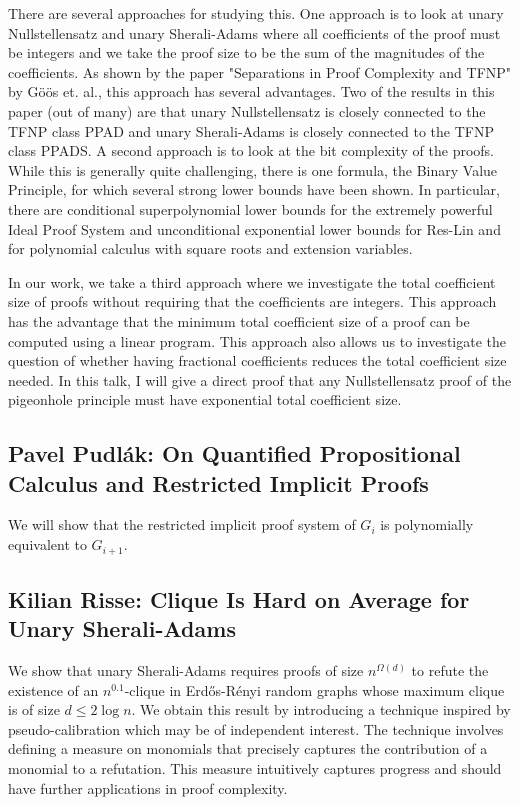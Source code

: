 \documentclass[11pt]{article}
\begin{document}
There are several approaches for studying this. One approach is to look at unary Nullstellensatz and unary Sherali-Adams where all coefficients of the proof must be integers and we take the proof size to be the sum of the magnitudes of the coefficients. As shown by the paper "Separations in Proof Complexity and TFNP" by Göös et. al., this approach has several advantages. Two of the results in this paper (out of many) are that unary Nullstellensatz is closely connected to the TFNP class PPAD and unary Sherali-Adams is closely connected to the TFNP class PPADS. A second approach is to look at the bit complexity of the proofs. While this is generally quite challenging, there is one formula, the Binary Value Principle, for which several strong lower bounds have been shown. In particular, there are conditional superpolynomial lower bounds for the extremely powerful Ideal Proof System and unconditional exponential lower bounds for Res-Lin and for polynomial calculus with square roots and extension variables.

In our work, we take a third approach where we investigate the total coefficient size of proofs without requiring that the coefficients are integers. This approach has the advantage that the minimum total coefficient size of a proof can be computed using a linear program. This approach also allows us to investigate the question of whether having fractional coefficients reduces the total coefficient size needed. In this talk, I will give a direct proof that any Nullstellensatz proof of the pigeonhole principle must have exponential total coefficient size. 



\subsection*{Pavel Pudl\'{a}k: On Quantified Propositional Calculus and Restricted Implicit Proofs}\label{Pudlak}

We will show that the restricted implicit proof system of $G_i$ is
polynomially equivalent to $G_{i+1}$.

\subsection*{Kilian Risse: Clique Is Hard on Average for Unary Sherali-Adams}\label{Risse}

We show that unary Sherali-Adams requires proofs of size $n^{\Omega(d)}$
to refute the existence of an $n^{0.1}$-clique in Erd\H{o}s-R\'{e}nyi
random graphs whose maximum clique is of size  $d\leq 2\log n$. We
obtain this result by introducing a technique inspired by
pseudo-calibration which may be of independent interest. The technique
involves defining a measure on monomials that precisely captures the
contribution of a monomial to a refutation. This measure intuitively
captures progress and should have further applications in proof complexity.
\end{document}

